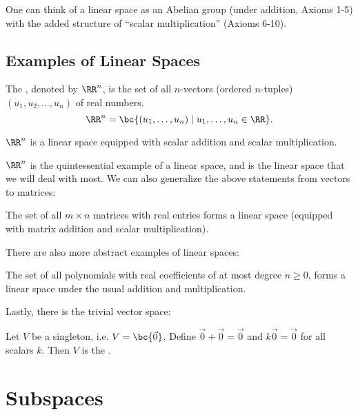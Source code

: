 One can think of a linear space as an Abelian group (under addition, Axioms 1-5) with the added structure of ``scalar multiplication'' (Axioms 6-10).

\subsection{Examples of Linear Spaces}

\begin{definition}
    The , denoted by $\RR^n$, is the set of all $n$-vectors (ordered $n$-tuples) $(u_1, u_2, \dots, u_n)$ of real numbers. \[\RR^n = \bc{(u_1, \dots, u_n) \mid u_1, \dots, u_n \in \RR}.\]
\end{definition}

\begin{proposition}
    $\RR^n$ is a linear space equipped with scalar addition and scalar multiplication.
\end{proposition}

$\RR^n$ is the quintessential example of a linear space, and is the linear space that we will deal with most. We can also generalize the above statements from vectors to matrices:

\begin{proposition}
    The set of all $m \times n$ matrices with real entries forms a linear space (equipped with matrix addition and scalar multiplication).
\end{proposition}

There are also more abstract examples of linear spaces: 

\begin{proposition}
    The set of all polynomials with real coefficients of at most degree $n \geq 0$, forms a linear space under the usual addition and multiplication.
\end{proposition}

Lastly, there is the trivial vector space:

\begin{definition}
    Let $V$ be a singleton, i.e. $V = \bc{\vec 0}$. Define $\vec 0 + \vec 0 = \vec 0$ and $k \vec 0 = \vec 0$ for all scalars $k$. Then $V$ is the .
\end{definition}

\section{Subspaces}

